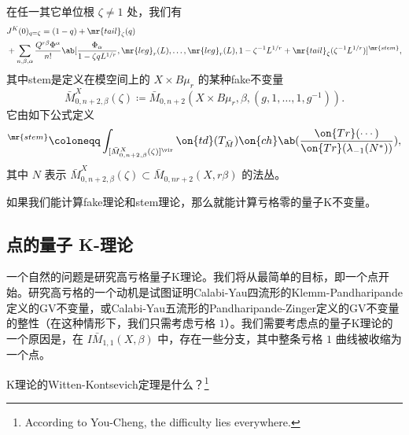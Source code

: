 \begin{prop}
    在任一其它单位根 \(\zeta \neq 1\) 处，我们有
    \begin{align*}
        &J^K(0)_{q = \zeta} = (1-q) + \mr{tail}_{\zeta}(q) \\
        &+ \sum_{n,\beta,\alpha} \frac{Q^{r\beta}\Phi^{\alpha}}{n!} \ab[\frac{\Phi_{\alpha}}{1-\zeta q L^{1/r}}, \mr{leg}_r(L), \ldots, \mr{leg}_r(L), 1 - \zeta^{-1}L^{1/r} + \mr{tail}_{\zeta}(\zeta^{-1} L^{1/r})]^{\mr{stem}},
    \end{align*}
    其中stem是定义在模空间上的 \(X \times B\mu_r\) 的某种fake不变量
    \[ \bar{M}_{0,n+2,\beta}^X(\zeta) \coloneqq \bar{M}_{0,n+2}(X \times B\mu_r, \beta, (g, 1, \ldots, 1, g^{-1})). \]
    它由如下公式定义
    \begin{align*}
        [\cdots]^{\mr{stem}} \coloneqq \int_{[\bar{M}_{0,n+2,\beta}^X(\zeta)]^{\vir}} \on{td}(T_{\bar{M}}) \on{ch}\ab(\frac{\on{Tr}(\cdots)}{\on{Tr}(\lambda_{-1}(N^*))}),
    \end{align*}
    其中 \(N\) 表示 \(\bar{M}_{0,n+2,\beta}^X(\zeta) \subset \bar{M}_{0,nr+2}(X, r\beta)\) 的法丛。
\end{prop}

\begin{rmk}
    如果我们能计算fake理论和stem理论，那么就能计算亏格零的量子K不变量。
\end{rmk}

\subsection{点的量子 K-理论}%
\label{sub:Quantum K-theory of a point}

一个自然的问题是研究高亏格量子K理论。我们将从最简单的目标，即一个点开始。研究高亏格的一个动机是试图证明Calabi-Yau四流形的Klemm-Pandharipande定义的GV不变量，或Calabi-Yau五流形的Pandharipande-Zinger定义的GV不变量的整性（在这种情形下，我们只需考虑亏格 \(1\)）。我们需要考虑点的量子K理论的一个原因是，在 \(I\bar{M}_{1,1}(X, \beta)\) 中，存在一些分支，其中整条亏格 \(1\) 曲线被收缩为一个点。

\begin{quest}
    K理论的Witten-Kontsevich定理是什么？\footnote{According to You-Cheng, the difficulty lies everywhere.}
\end{quest}

